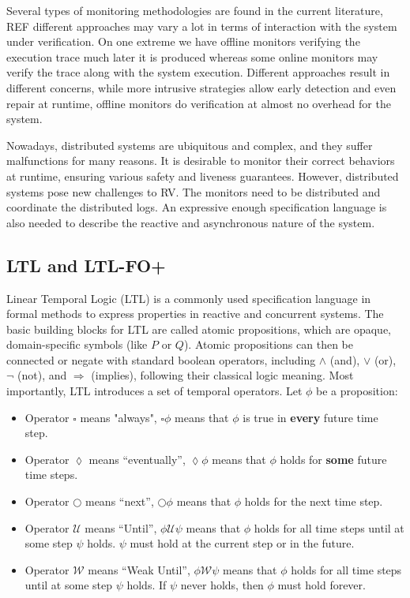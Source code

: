\documentclass[format=acmsmall, nonacm=true, review=true, screen=true]{acmart}
\begin{document}
Several types of monitoring methodologies are found in the current literature, REF different approaches may vary a lot in terms of interaction with the system under verification. On one extreme we have offline monitors verifying the execution trace much later it is produced whereas some online monitors may verify the trace along with the system execution. Different approaches result in different concerns, while more intrusive strategies allow early detection and even repair at runtime, offline monitors do verification at almost no overhead for the system.

Nowadays, distributed systems are ubiquitous and complex, and they suffer malfunctions for many reasons. It is desirable to monitor their correct behaviors at runtime, ensuring various safety and liveness guarantees. However, distributed systems pose new challenges to RV. The monitors need to be distributed and coordinate the distributed logs. An expressive enough specification language is also needed to describe the reactive and asynchronous nature of the system.

\subsection{LTL and LTL-FO+}
Linear Temporal Logic (LTL) is a commonly used specification language in formal methods to express properties in reactive and concurrent systems. The basic building blocks for LTL are called atomic propositions, which are opaque, domain-specific symbols (like $P$ or $Q$). Atomic propositions can then be connected or negate with standard boolean operators, including $\land$ (and), $\lor$ (or), $\lnot$ (not), and $\Rightarrow$ (implies), following their classical logic meaning. Most importantly, LTL introduces a set of temporal operators. Let $\phi$ be a proposition:
\begin{itemize}
  \item Operator $\square$ means "always", $\square \phi$ means that $\phi$ is true in \textbf{every} future time step.
  \item Operator $\lozenge$ means “eventually”, $\lozenge \phi$ means that $\phi$ holds for \textbf{some} future time steps.
  \item Operator $\bigcirc$ means “next”, $\bigcirc\phi$ means that $\phi$ holds for the next time step.
  \item Operator $\mathcal{U}$ means “Until”, $\phi \mathcal{U}\psi$ means that $\phi$ holds for all time steps until at some step $\psi$ holds. $\psi$ must hold at the current step or in the future.
  \item Operator $\mathcal{W}$ means “Weak Until”, $\phi \mathcal{W}\psi$ means that $\phi$ holds for all time steps until at some step $\psi$ holds. If $\psi$ never holds, then $\phi$ must hold forever.
\end{itemize}
\end{document}
